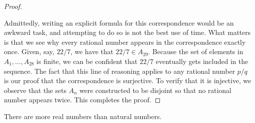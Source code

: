 \documentclass[11pt,twoside=off,numbers=noenddot]{scrbook}
\begin{document}
\begin{proof}
\begin{tightfigure}
  \end{tightfigure}

  Admittedly, writing an explicit formula for this correspondence
  would be an awkward task, and attempting to do so is not the best
  use of time. What matters is that we see why every rational number
  appears in the correspondence exactly once. Given, say, $22/7$, we
  have that $22/7 \in A_{29}$. Because the set of elements in $A_1,
  \dots, A_{28}$ is finite, we can be confident that $22/7$
  eventually gets included in the sequence. The fact that this line
  of reasoning applies to any rational number $p/q$ is our proof that
  the correspondence is surjective. To verify that it is injective,
  we observe that the sets $A_n$ were constructed to be disjoint so
  that no rational number appears twice. This completes the proof.
\end{proof}

\begin{theorem}[$\abs{\RR} > \abs{\NN}$]
  There are more real numbers than natural numbers.
\end{theorem}
\end{document}
